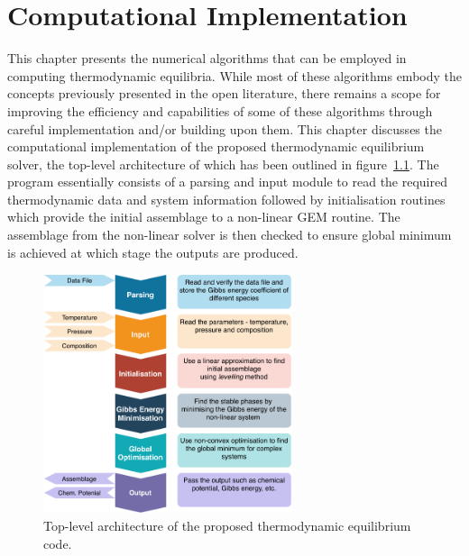 \chapter{Computational Implementation} \label{chapter_5}


	This chapter presents the numerical algorithms that can be employed in computing thermodynamic equilibria. While most of these algorithms embody the concepts previously presented in the open literature, there remains a scope for improving the efficiency and capabilities of some of these algorithms through careful implementation and/or building upon them. This chapter discusses the computational implementation of the proposed thermodynamic equilibrium solver, the top-level architecture of which has been outlined in figure~\ref{fig:structure}. The program essentially consists of a parsing and input module to read the required thermodynamic data and system information followed by initialisation routines which provide the initial assemblage to a non-linear GEM routine. The assemblage from the non-linear solver is then checked to ensure global minimum is achieved at which stage the outputs are produced.
	\begin{figure}[htbp]
	 	\centering
	   	\includegraphics[width=0.65\textwidth]{figures/YJ_structure.pdf} 
	   	\caption{Top-level architecture of the proposed thermodynamic equilibrium code.}
	   	\label{fig:structure}
	\end{figure}
	
